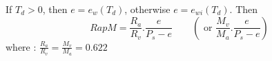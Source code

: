 If $T_d > 0$, then $ e = e_w(T_d)$, otherwise $e = e_{wi}(T_d)$. Then
\[
RapM = \frac{R_a}{R_v} . \frac{e}{P_s - e } 
\qquad \left(\textrm{ or } \frac{M_v}{M_a} . \frac{e }{P_s - e } \right)
\]
where :  $\frac{R_a}{R_v} = \frac{M_v}{M_a} = 0.622$
